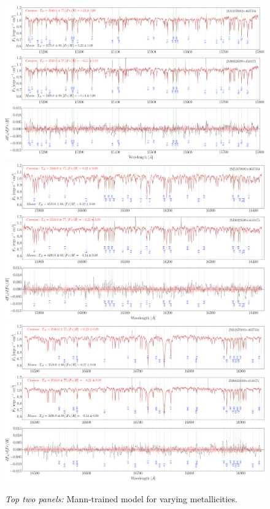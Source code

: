 \documentclass[modern]{aastex62}
\begin{document}
\begin{figure}[ht]
\begin{center}
\includegraphics[width=16cm]{figures/demo_derivatives_feh1.png}
\includegraphics[width=16cm]{figures/demo_derivatives_feh2.png}
\includegraphics[width=16cm]{figures/demo_derivatives_feh3.png}
\end{center}
\caption{\textit{Top two panels:} Mann-trained model for varying metallicities.} \label{fig:demo_feh}
\end{figure}
\end{document}
